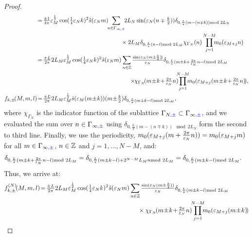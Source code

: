 \documentclass[a4paper, 11pt]{article}
\DeclareMathOperator{\1}{\mathds{1}}
\begin{document}
\begin{proof}
\begin{align*}
&\!=\!\tfrac{\pm1}{4\pi}\vep_{M}^{\frac{1}{2}} \cos(\tfrac{1}{4}\vep_{N}k)^{2}\hat{s}(\vep_{N}m)\!\!\sum_{n\in\Gamma_{\infty,{\color{blue}\pm}}}\!\!2L_{N}\sin(\vep_{N}(n\mp\tfrac{k}{2}))\delta_{0,\frac{L}{\pi}(m-(n\mp k))\!\!\!\!\mod 2L_{N}} \\
& \hspace{5cm} \times 2L_{M}\delta_{0,\frac{L}{\pi}(n-l)\!\!\!\!\mod 2L_{M}}\chi_{\Gamma_{N}}(n)\prod_{j=1}^{N-M}\!\!\!m_{0}(\vep_{M+j}n) \\
&\!=\!\tfrac{\pm L}{2\pi}2L_{M}\vep_{M}^{\frac{1}{2}} \cos(\tfrac{1}{4}\vep_{N}k)^{2}\hat{s}(\vep_{N}m)\sum_{n\in\Z}\tfrac{\sin(\vep_{N}(m\pm\frac{k}{2})\!)}{\vep_{N}} \delta_{0,\frac{L}{\pi}(m\pm k+\frac{2\pi}{\vep_{N}}n-l)\!\!\!\!\mod 2L_{M}}\\
& \hspace{5.5cm} \times\!\!\chi_{\Gamma_{N}}\!(m\!\pm\!k\!+\!\tfrac{2\pi}{\vep_{N}}n)\!\!\!\prod_{j=1}^{N-M}\!\!\!m_{0}(\vep_{M+j}(m\!\pm\!k\!+\!\tfrac{2\pi}{\vep_{N}}n)\!), \\
f_{k,\pm}\!(M,m,l) &\!=\!\tfrac{\pm L}{2\pi}2L_{M}\vep_{M}^{\frac{1}{2}}\hat{s}(\vep_{M}(m\!\pm\!k))(m\!\pm\!\tfrac{k}{2})\delta_{0,\frac{L}{\pi}(m\pm k-l)\!\!\!\!\mod 2L_{M}},
\end{align*}
where $\chi_{\Gamma_{N}}$ is the indicator function of the sublattice $\Gamma_{N,{\color{blue}\pm}}\subset\Gamma_{\infty,{\color{blue}\pm}}$, and we evaluated the sum over $n\in\Gamma_{\infty,{\color{blue}\pm}}$ using $\delta_{0,\frac{L}{\pi}(m-(n\mp k))\!\!\!\!\mod 2L_{N}}$ form the second to third line. Finally, we use the periodicity, $m_{0}(\varepsilon_{M+j}(m+\tfrac{2\pi}{\varepsilon_{N}}n)) = m_{0}(\varepsilon_{M+j}m)$ for all $m\in\Gamma_{\infty,{\color{blue}\pm}}$, $n\in\mathbb{Z}$ and $j=1,\dots,N-M$, and:
\begin{align*}
\delta_{0,\frac{L}{\pi}(m\pm k+\frac{2\pi}{\vep_{N}}n-l)\!\!\!\!\mod 2L_{M}} & = \delta_{0,\frac{L}{\pi}(m\pm k-l)+2^{N-M}L_{M}n\!\!\!\!\mod 2L_{M}} = \delta_{0,\frac{L}{\pi}(m\pm k-l)\!\!\!\!\mod 2L_{M}}.
\end{align*}
Thus, we arrive at:
\begin{align*}
f^{(N)}_{k,\pm}\!(M,m,l) &\!=\!\tfrac{\pm L}{2\pi}2L_{M}\vep_{M}^{\frac{1}{2}} \cos(\tfrac{1}{4}\vep_{N}k)^{2}\hat{s}(\vep_{N}m)\sum_{n\in\Z}\tfrac{\sin(\vep_{N}(m\pm\frac{k}{2}))}{\vep_{N}} \delta_{0,\frac{L}{\pi}(m\pm k-l)\!\!\!\!\mod 2L_{M}}\\
& \hspace{5.5cm} \times \chi_{\Gamma_{N}}\!(m\!\pm\!k\!+\!\tfrac{2\pi}{\vep_{N}}n)\!\!\prod_{j=1}^{N-M}\!\!\!m_{0}(\vep_{M+j}(m\!\pm\!k)\!) \\

\end{align*}
\end{proof}
\end{document}
